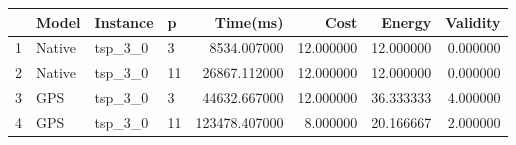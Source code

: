 \begin{tabular}{llllrrrr}
\toprule
 & Model & Instance & p & Time(ms) & Cost & Energy & Validity \\
\midrule
1 & Native & tsp_3_0 & 3 & 8534.007000 & 12.000000 & 12.000000 & 0.000000 \\
2 & Native & tsp_3_0 & 11 & 26867.112000 & 12.000000 & 12.000000 & 0.000000 \\
3 & GPS & tsp_3_0 & 3 & 44632.667000 & 12.000000 & 36.333333 & 4.000000 \\
4 & GPS & tsp_3_0 & 11 & 123478.407000 & 8.000000 & 20.166667 & 2.000000 \\
\bottomrule
\end{tabular}
